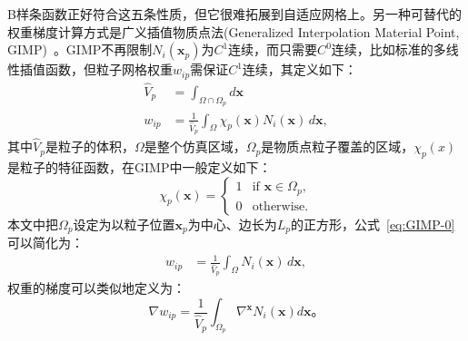 B样条函数正好符合这五条性质，但它很难拓展到自适应网格上。另一种可替代的权重梯度计算方式是广义插值物质点法(Generalized Interpolation Material Point, GIMP)~\cite{bardenhagen2004generalized}。GIMP不再限制$N_i(\mathbf{x}_p)$为$C^1$连续，而只需要$C^0$连续，比如标准的多线性插值函数，但粒子网格权重$w_{ip}$需保证$C^1$连续，其定义如下：
\begin{equation}
    \begin{aligned}
        \hat{V}_p &= \int_{\Omega\cap\Omega_p} d\mathbf{x} \\
        w_{ip} &= \frac{1}{\hat{V}_p} \int_{\Omega} \chi_p(\mathbf{x}) N_i(\mathbf{x}) \, d\mathbf{x},
    \end{aligned}
    \label{eq:GIMP-0}
\end{equation}
其中$\hat{V}_p$是粒子的体积，$\Omega$是整个仿真区域，$\Omega_p$是物质点粒子覆盖的区域，$\chi_p(x)$是粒子的特征函数，在GIMP中一般定义如下：
\begin{equation}
    \chi_p(\mathbf{x}) = 
\begin{cases}
1 & \text{if } \mathbf{x} \in \Omega_p, \\
0 & \text{otherwise}.
\end{cases}
\end{equation}
本文中把$\Omega_p$设定为以粒子位置$\mathbf{x}_p$为中心、边长为$L_p$的正方形，公式~\ref{eq:GIMP-0}可以简化为：
\begin{equation}
    \begin{aligned}
        w_{ip} &= \frac{1}{\hat{V}_p} \int_{\Omega} N_i(\mathbf{x}) \, d\mathbf{x},
    \end{aligned}
\end{equation}
权重的梯度可以类似地定义为：
\begin{equation}
    \nabla w_{ip} = \frac{1}{\hat{V}_p} \int_{\Omega_p} \nabla^{\mathbf{x}} N_i(\mathbf{x}) d\mathbf{x}。
\end{equation}

